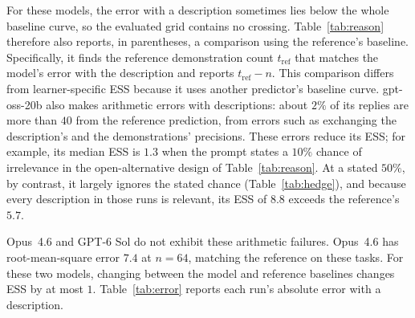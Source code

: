 \documentclass{article}
\theoremstyle{definition}
\begin{document}
For these models, the error with a description sometimes lies below the whole baseline curve, so the evaluated grid contains no crossing. Table~\ref{tab:reason} therefore also reports, in parentheses, a comparison using the reference's baseline. Specifically, it finds the reference demonstration count $t_{\mathrm{ref}}$ that matches the model's error with the description and reports $t_{\mathrm{ref}}-n$. This comparison differs from learner-specific ESS because it uses another predictor's baseline curve. gpt-oss-20b also makes arithmetic errors with descriptions: about $2\%$ of its replies are more than $40$ from the reference prediction, from errors such as exchanging the description's and the demonstrations' precisions. These errors reduce its ESS; for example, its median ESS is $1.3$ when the prompt states a $10\%$ chance of irrelevance in the open-alternative design of Table~\ref{tab:reason}. At a stated $50\%$, by contrast, it largely ignores the stated chance (Table~\ref{tab:hedge}), and because every description in those runs is relevant, its ESS of $8.8$ exceeds the reference's $5.7$.

Opus~4.6 and GPT-6 Sol do not exhibit these arithmetic failures. Opus~4.6 has root-mean-square error $7.4$ at $n=64$, matching the reference on these tasks. For these two models, changing between the model and reference baselines changes ESS by at most $1$. Table~\ref{tab:error} reports each run's absolute error with a description.

\begin{table}[t]
\centering\small
\setlength{\tabcolsep}{2.5pt}
\caption{\textbf{Description ESS across reasoning settings.} Results use the first $200$ tasks at $\sigma=60$. Median ESS uses each run's own baseline curve; parentheses report the value computed using the reference baseline where it differs. ``Stated irrelevance'' gives the stated probability that a description generated at $c=36$ is irrelevant, in the open-alternative design of Appendix~\ref{app:llm-reliability}: every description is in fact relevant, and the prompt says only that the mean is otherwise unknown. These columns therefore differ from the mixed design of Section~\ref{sec:llm-stated}, whose results are in Table~\ref{tab:matched}. The last column fixes the generating precision at $36$ and states it as $4$. Each run names the mode and, in parentheses, the provider's effort setting. An upper bound, $\leq$, indicates that one demonstration alone gives lower error; $>60$ means that the error with the description lies below the model's entire baseline curve, through $n=64$, so no crossing exists on the grid. Reference values use the same tasks and estimator. The open-weight rows without reasoning take these $200$ tasks from the $2{,}000$-task run, whose results on all its tasks are in Table~\ref{tab:llm}. The runs also include three further conditions in which the stated precision differs from the generating one, not shown.}
\label{tab:reason}
\vspace{3pt}

\end{table}
\end{document}
